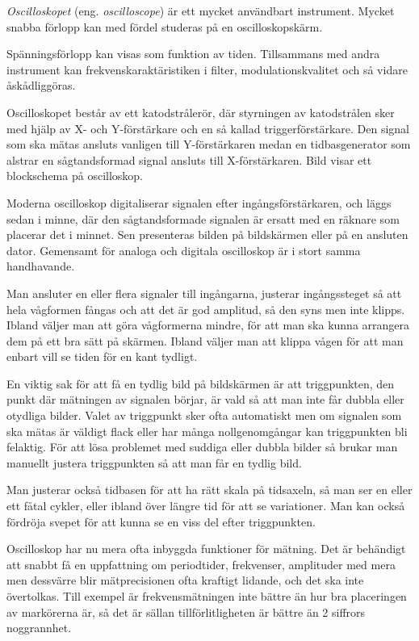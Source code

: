
\emph{Oscilloskopet} (eng. \emph{oscilloscope}) är ett mycket användbart
instrument.
Mycket snabba förlopp kan med fördel studeras på en oscilloskopskärm.

Spänningsförlopp kan visas som funktion av tiden.
Tillsammans med andra instrument kan frekvenskaraktäristiken i filter,
modulationskvalitet och så vidare åskådliggöras.

Oscilloskopet består av ett katodstrålerör, där styrningen av katodstrålen sker
med hjälp av X- och Y-förstärkare och en så kallad triggerförstärkare.
Den signal som ska mätas ansluts vanligen till Y-förstärkaren medan en
tidbasgenerator som alstrar en sågtandsformad signal ansluts till X-förstärkaren.
Bild  visar ett blockschema på oscilloskop.

Moderna oscilloskop digitaliserar signalen efter ingångsförstärkaren,
och läggs sedan i minne, där den sågtandsformade signalen är ersatt med en
räknare som placerar det i minnet.
Sen presenteras bilden på bildskärmen eller på en ansluten dator.
Gemensamt för analoga och digitala oscilloskop är i stort samma handhavande.

Man ansluter en eller flera signaler till ingångarna, justerar ingångssteget
så att hela vågformen fångas och att det är god amplitud, så den syns men inte
klipps.
Ibland väljer man att göra vågformerna mindre, för att man ska kunna
arrangera dem på ett bra sätt på skärmen.
Ibland väljer man att klippa vågen för att man enbart vill se tiden för en
kant tydligt.

En viktig sak för att få en tydlig bild på bildskärmen är att triggpunkten,
den punkt där mätningen av signalen börjar, är vald så att man inte får dubbla
eller otydliga bilder.
Valet av triggpunkt sker ofta automatiskt men om signalen som ska mätas är
väldigt flack eller har många nollgenomgångar kan triggpunkten bli felaktig.
För att lösa problemet med suddiga eller dubbla bilder så brukar man manuellt
justera triggpunkten så att man får en tydlig bild.

Man justerar också tidbasen för att ha rätt skala på tidsaxeln, så man ser en
eller ett fåtal cykler, eller ibland över längre tid för att se variationer.
Man kan också fördröja svepet för att kunna se en viss del efter triggpunkten.

Oscilloskop har nu mera ofta inbyggda funktioner för mätning.
Det är behändigt att snabbt få en uppfattning om periodtider, frekvenser,
amplituder med mera men dessvärre blir mätprecisionen ofta kraftigt lidande,
och det ska inte övertolkas.
Till exempel är frekvensmätningen inte bättre än hur bra placeringen av markörerna är,
så det är sällan tillförlitligheten är bättre än 2 siffrors noggrannhet.

